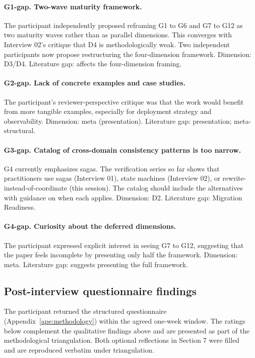 \paragraph*{G1-gap. Two-wave maturity framework.} The participant independently proposed reframing G1 to G6 and G7 to G12 as two maturity waves rather than as parallel dimensions. This converges with Interview 02's critique that D4 is methodologically weak. Two independent participants now propose restructuring the four-dimension framework. Dimension: D3/D4. Literature gap: affects the four-dimension framing.

\paragraph*{G2-gap. Lack of concrete examples and case studies.} The participant's reviewer-perspective critique was that the work would benefit from more tangible examples, especially for deployment strategy and observability. Dimension: meta (presentation). Literature gap: presentation; meta-structural.

\paragraph*{G3-gap. Catalog of cross-domain consistency patterns is too narrow.} G4 currently emphasizes sagas. The verification series so far shows that practitioners use sagas (Interview 01), state machines (Interview 02), or rewrite-instead-of-coordinate (this session). The catalog should include the alternatives with guidance on when each applies. Dimension: D2. Literature gap: Migration Readiness.

\paragraph*{G4-gap. Curiosity about the deferred dimensions.} The participant expressed explicit interest in seeing G7 to G12, suggesting that the paper feels incomplete by presenting only half the framework. Dimension: meta. Literature gap: suggests presenting the full framework.

\subsection*{Post-interview questionnaire findings}

The participant returned the structured questionnaire (Appendix~\ref{ape:methodology}) within the agreed one-week window. The ratings below complement the qualitative findings above and are presented as part of the methodological triangulation. Both optional reflections in Section 7 were filled and are reproduced verbatim under triangulation.

